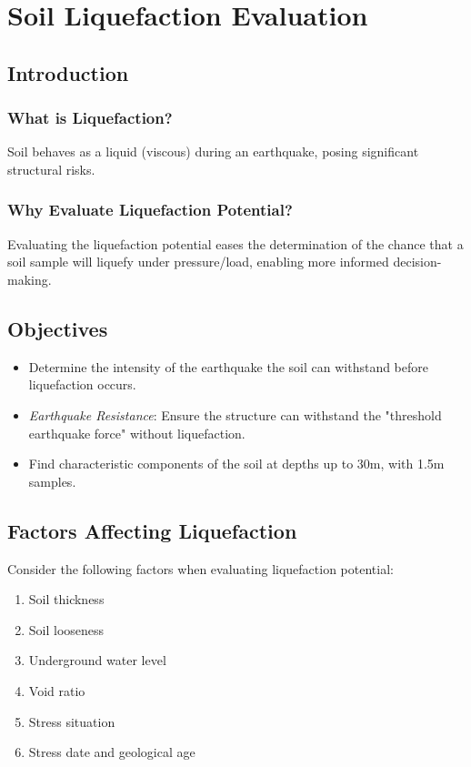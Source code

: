 \chapter{Soil Liquefaction Evaluation}

\section{Introduction}
\subsection{What is Liquefaction?}
Soil behaves as a liquid (viscous) during an earthquake, posing significant structural risks.

\subsection{Why Evaluate Liquefaction Potential?}
Evaluating the liquefaction potential eases the determination of the chance that a soil sample will liquefy under pressure/load, enabling more informed decision-making.

\section{Objectives}
\begin{itemize}
    \item Determine the intensity of the earthquake the soil can withstand before liquefaction occurs.
    \item \textit{Earthquake Resistance}: Ensure the structure can withstand the "threshold earthquake force" without liquefaction.
    \item Find characteristic components of the soil at depths up to 30m, with 1.5m samples.
\end{itemize}
\clearpage
\newpage
\section{Factors Affecting Liquefaction}
Consider the following factors when evaluating liquefaction potential:
\begin{enumerate}
    \item Soil thickness
    \item Soil looseness
    \item Underground water level
    \item Void ratio
    \item Stress situation
    \item Stress date and geological age
\end{enumerate}

